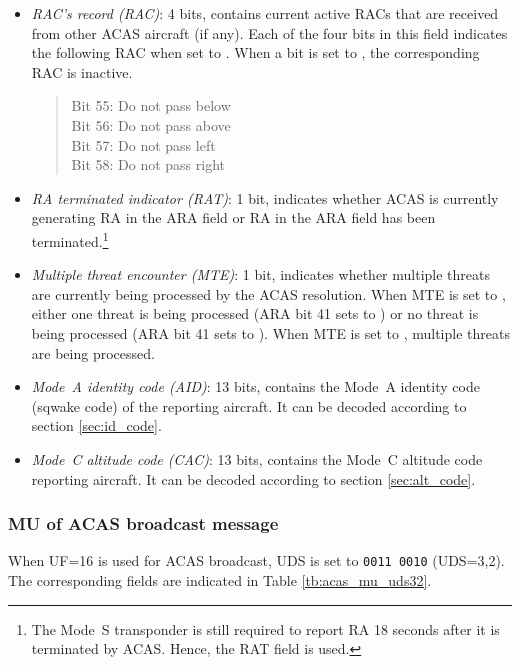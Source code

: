 \begin{itemize}
  \item \emph{RAC's record (RAC)}: 4 bits, contains current active RACs that are received from other ACAS aircraft (if any). Each of the four bits in this field indicates the following RAC when set to \1. When a bit is set to \0, the corresponding RAC is inactive.

  \begin{quote}
    \small
    Bit 55: Do not pass below \\
    Bit 56: Do not pass above \\
    Bit 57: Do not pass left \\
    Bit 58: Do not pass right
  \end{quote}


  \item \emph{RA terminated indicator (RAT)}: 1 bit, indicates whether ACAS is currently generating RA in the ARA field or RA in the ARA field has been terminated.\footnote{The Mode~S transponder is still required to report RA 18 seconds after it is terminated by ACAS. Hence, the RAT field is used.}


  \item \emph{Multiple threat encounter (MTE)}: 1 bit, indicates whether multiple threats are currently being processed by the ACAS resolution. When MTE is set to \0, either one threat is being processed (ARA bit 41 sets to \1) or no threat is being processed (ARA bit 41 sets to \0). When MTE is set to \1, multiple threats are being processed.

  \item \emph{Mode~A identity code (AID)}: 13 bits, contains the Mode~A identity code (sqwake code) of the reporting aircraft. It can be decoded according to section \ref{sec:id_code}.

  \item \emph{Mode~C altitude code (CAC)}: 13 bits, contains the Mode~C altitude code reporting aircraft. It can be decoded according to section \ref{sec:alt_code}.


\end{itemize}



\subsubsection{MU of ACAS broadcast message}

When UF=16 is used for ACAS broadcast, UDS is set to \texttt{0011 0010} (UDS=3,2). The corresponding fields are indicated in Table \ref{tb:acas_mu_uds32}.

